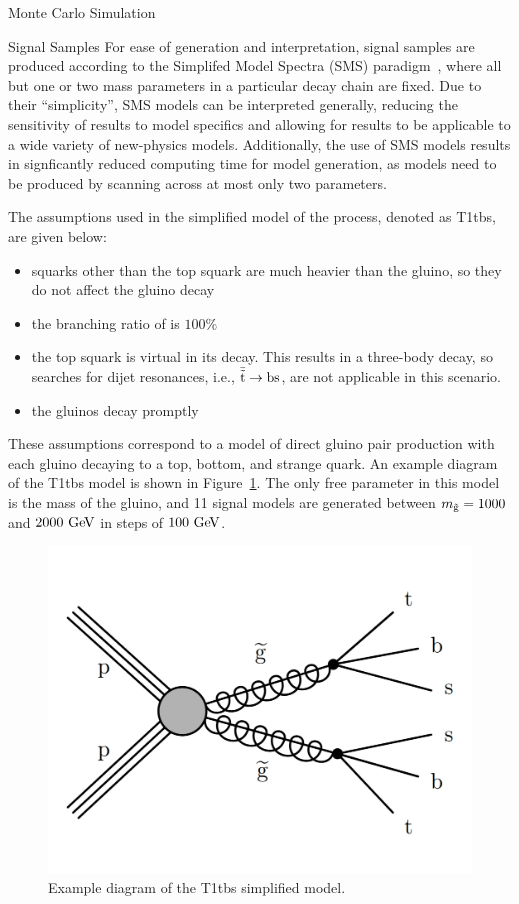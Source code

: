 \begin{section}{Monte Carlo Simulation}
\begin{subsection}{Signal Samples}
For ease of generation and interpretation, signal samples are produced according to the Simplifed Model Spectra (SMS) paradigm~\cite{Alwall:2008ag,Alves:2011wf}, where all but one or two mass parameters in a particular decay chain are fixed.
Due to their ``simplicity'', SMS models can be interpreted generally, reducing the sensitivity of results to model specifics and allowing for results to be applicable to a wide variety of new-physics models.
Additionally, the use of SMS models results in signficantly reduced computing time for model generation, as models need to be produced by scanning across at most only two parameters.

The assumptions used in the simplified model of the \rpvDecay process, denoted as T1tbs, are given below:
\begin{itemize}
\item squarks other than the top squark are much heavier than the gluino, so they do not affect the gluino decay
\item the branching ratio of \rpvDecay is $100\%$
\item the top squark is virtual in its decay. This results in a three-body decay, so searches for dijet resonances, i.e., $\bar{\tilde{\mathrm{t}}} \to \mathrm{bs}$, are not applicable in this scenario.
\item the gluinos decay promptly
\end{itemize}

These assumptions correspond to a model of direct gluino pair production with each gluino decaying to a top, bottom, and strange quark. 
An example diagram of the T1tbs model is shown in Figure~\ref{fig:T1tbs_diagram}.
The only free parameter in this model is the mass of the gluino, and 11 signal models are generated between $m_{\tilde{\mathrm{g}}} = 1000$ and $2000~\mathrm{Ge\kern -0.1em V}$ in steps of $100~\mathrm{Ge\kern -0.1em V}$.

\begin{figure}[tbp!]
\begin{center}
\includegraphics[angle=0,width=0.60\columnwidth]{fig/T1tbs_diagram.png}
\end{center}
\caption{Example diagram of the T1tbs simplified model.}
\label{fig:T1tbs_diagram}
\end{figure}


\end{subsection}
\end{section}

